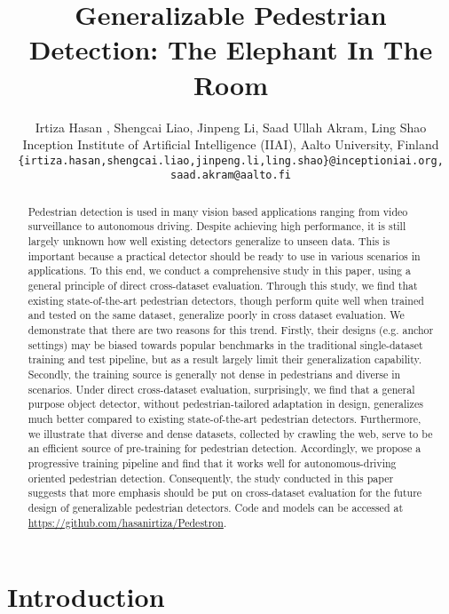 \documentclass[final]{cvpr}
\let\footnoteR\footnoteB
\begin{document}
\title{Generalizable Pedestrian Detection: The Elephant In The Room}

\author{Irtiza Hasan , Shengcai Liao, Jinpeng Li, Saad Ullah Akram, Ling Shao\\
{\normalsize Inception Institute of Artificial Intelligence (IIAI), Aalto University, Finland}\\
{\tt\small \{irtiza.hasan,shengcai.liao,jinpeng.li,ling.shao\}@inceptioniai.org, saad.akram@aalto.fi}}
\maketitle

\renewcommand{\thefootnote}{\arabic{footnote}}
\begin{abstract}
Pedestrian detection is used in many vision based applications ranging from video surveillance to autonomous driving. Despite achieving high performance, it is still largely unknown how well existing detectors generalize to unseen data. This is important because a practical detector should be ready to use in various scenarios in applications. To this end, we conduct a comprehensive study in this paper, using a general principle of direct cross-dataset evaluation. Through this study, we find that existing state-of-the-art pedestrian detectors, though perform quite well when trained and tested on the same dataset, generalize poorly in cross dataset evaluation. We demonstrate that there are two reasons for this trend. Firstly, their designs (e.g. anchor settings) may be biased towards popular benchmarks in the traditional single-dataset training and test pipeline, but as a result largely limit their generalization capability. Secondly, the training source is generally not dense in pedestrians and diverse in scenarios. 
Under direct cross-dataset evaluation, surprisingly, we find that a general purpose object detector, without pedestrian-tailored adaptation in design, generalizes much better compared to existing state-of-the-art pedestrian detectors. Furthermore, we illustrate that diverse and dense datasets, collected by crawling the web, serve to be an efficient source of pre-training for pedestrian detection. Accordingly, we propose a progressive training pipeline and find that it works well for autonomous-driving oriented pedestrian detection. Consequently, the study conducted in this paper suggests that more emphasis should be put on cross-dataset evaluation for the future design of generalizable pedestrian detectors. Code and models can be accessed at \url{https://github.com/hasanirtiza/Pedestron}.

\end{abstract} \section{Introduction}
\label{sec:intro}
\footnoteR{Corresponding author.}
\end{document}
